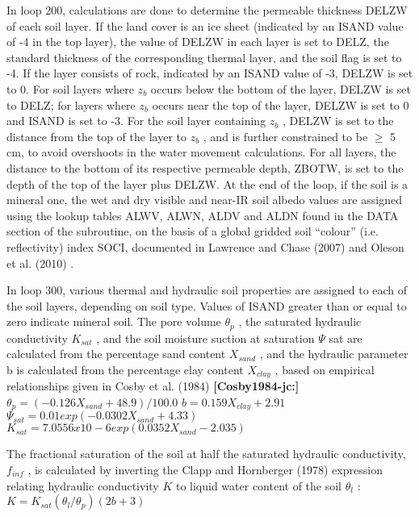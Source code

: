 In loop 200, calculations are done to determine the permeable thickness D\+E\+L\+Z\+W of each soil layer. If the land cover is an ice sheet (indicated by an I\+S\+A\+N\+D value of -\/4 in the top layer), the value of D\+E\+L\+Z\+W in each layer is set to D\+E\+L\+Z, the standard thickness of the corresponding thermal layer, and the soil flag is set to -\/4. If the layer consists of rock, indicated by an I\+S\+A\+N\+D value of -\/3, D\+E\+L\+Z\+W is set to 0. For soil layers where $z_b$ occurs below the bottom of the layer, D\+E\+L\+Z\+W is set to D\+E\+L\+Z; for layers where $z_b$ occurs near the top of the layer, D\+E\+L\+Z\+W is set to 0 and I\+S\+A\+N\+D is set to -\/3. For the soil layer containing $z_b$ , D\+E\+L\+Z\+W is set to the distance from the top of the layer to $z_b$ , and is further constrained to be $\geq$ 5 cm, to avoid overshoots in the water movement calculations. For all layers, the distance to the bottom of its respective permeable depth, Z\+B\+O\+T\+W, is set to the depth of the top of the layer plus D\+E\+L\+Z\+W. At the end of the loop, if the soil is a mineral one, the wet and dry visible and near-\/\+I\+R soil albedo values are assigned using the lookup tables A\+L\+W\+V, A\+L\+W\+N, A\+L\+D\+V and A\+L\+D\+N found in the D\+A\+T\+A section of the subroutine, on the basis of a global gridded soil “colour” (i.\+e. reflectivity) index S\+O\+C\+I, documented in Lawrence and Chase (2007) \cite{Lawrence2007-bc} and Oleson et al. (2010) \cite{Oleson2010-c88}.

In loop 300, various thermal and hydraulic soil properties are assigned to each of the soil layers, depending on soil type. Values of I\+S\+A\+N\+D greater than or equal to zero indicate mineral soil. The pore volume $\theta_p$ , the saturated hydraulic conductivity $K_{sat}$ , and the soil moisture suction at saturation $\Psi$ sat are calculated from the percentage sand content $X_{sand}$ , and the hydraulic parameter b is calculated from the percentage clay content $X_{clay}$ , based on empirical relationships given in Cosby et al. (1984) {\bfseries [Cosby1984-\/jc\+:]} $\theta_p = (-0.126 X_{sand} +48.9)/100.0$ $b = 0.159 X_{clay} + 2.91$ $\Psi_{sat} = 0.01 exp(-0.0302 X_{sand} + 4.33)$ $K_{sat} = 7.0556 x 10 -6 exp(0.0352 X_{sand} - 2.035)$

The fractional saturation of the soil at half the saturated hydraulic conductivity, $f_{inf}$ , is calculated by inverting the Clapp and Hornberger (1978) \cite{Clapp1978-898} expression relating hydraulic conductivity $K$ to liquid water content of the soil $\theta_l$ \+: $K = K_{sat} (\theta_l / \theta_p ) (2b + 3)$


